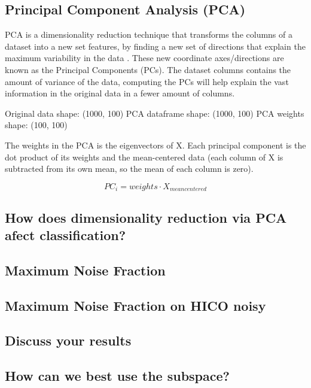 \subsection{Principal Component Analysis (PCA)}

PCA is a dimensionality reduction technique that transforms the columns of a dataset 
into a new set features, by finding a new set of directions that explain the maximum 
variability in the data \cite{prabhakaran2019}. These new coordinate axes/directions 
are known as the Principal Components (PCs). The dataset columns contains the amount 
of variance of the data, computing the PCs will help explain the vast information in 
the original data in a fewer amount of columns. 

Original data shape:  (1000, 100)
PCA dataframe shape:  (1000, 100)
PCA weights shape:  (100, 100)

The weights in the PCA is the eigenvectors of X. Each principal component is the dot 
product of its weights and the mean-centered data (each column of X is subtracted from 
its own mean, so the mean of each column is zero). 

\begin{equation}
    PC_i = weights \cdot X_{meancentered}
\end{equation}


\subsection{How does dimensionality reduction via PCA afect classification?}

\subsection{Maximum Noise Fraction}

\subsection{Maximum Noise Fraction on HICO noisy}

\subsection{Discuss your results}

\subsection{How can we best use the subspace?}
